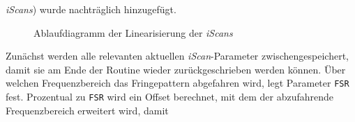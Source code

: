\textit{iScans}) wurde nachträglich hinzugefügt.\par
\begin{figure}[hp]
 	\centering
	\caption[Linearisierung der \textit{iScans} -
	Ablaufdiagramm]{Ablaufdiagramm der
	Linearisierung der \textit{iScans}}\label{fig:linearisierung_ablaufdiagramm}
\end{figure}
Zunächst werden alle relevanten aktuellen \textit{iScan}-Parameter
zwischengespeichert, damit sie am Ende der Routine wieder zurückgeschrieben
werden können. Über welchen Frequenzbereich das Fringepattern abgefahren wird,
legt Parameter \lstinline|FSR| fest.
Prozentual zu \lstinline|FSR| wird ein Offset berechnet, mit dem der abzufahrende Frequenzbereich erweitert wird, damit
